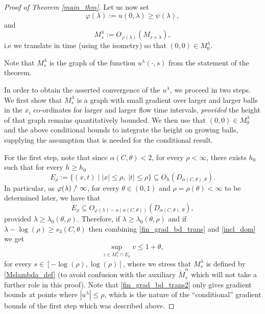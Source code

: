 \documentclass[leqno,11pt]{amsart}
\theoremstyle{definition}
\begin{document}
\begin{proof}[Proof of Theorem \ref{main_thm}]
\bigskip

Let us now set
\begin{equation}
\varphi(\lambda):=u(0,\lambda) \geq \psi(\lambda),
\end{equation}
and 
\begin{equation}\label{Mslambda_def}
M_s^{\lambda}:=O_{\varphi(\lambda)}(M_{s+\lambda}),
\end{equation}
i.e we translate in time (using the isometry) so that $(0,0)\in M_0^{\lambda}$. {Note that $M_s^{\lambda}$ is the graph of the function $u^{\lambda}(\cdot,s)$  from the statement of the theorem.

In order to obtain the asserted convergence of the $u^{\lambda}$, we proceed in two steps. We first show that $M^{\lambda}_s$ is a graph with small gradient over larger and larger balls in the $x_i$ co-ordinates for larger and larger flow time intervals, \textit{provided} the height of that graph remains quantitatively  bounded. We then use that $(0,0)\in M_{0}^{\lambda}$ and the above conditional bounds to integrate the height on growing balls, supplying the assumption that is needed for the conditional result.}

For the first step, note that since $\alpha(C,\theta)<2$, for every $\rho<\infty$, there exists $h_0$ such that for every $h\geq h_0$
\begin{equation}\label{incl_dom_first}
E_{\rho}:=\{(x,t)\;|\; |x|\leq \rho,\; |t| \leq \rho \} \subseteq O_{h}\left(D_{\alpha(C,\theta),\theta}\right).
\end{equation}
In particular, as  $\varphi(\lambda)\nnearrow \infty$, for every $\theta\in (0,1)$ and $\rho=\rho(\theta)<\infty$ to be determined later, we have that
\begin{equation}\label{incl_dom}
E_{\rho} \subseteq O_{ \varphi(\lambda)-a(\alpha(C,\theta))}\left(D_{\alpha(C,\theta),\theta}\right), 
\end{equation}
provided $\lambda\geq \lambda_0(\theta,\rho)$.  Therefore, if $\lambda\geq \lambda_0(\theta,\rho)$ and if $\lambda-\log(\rho)\geq s_3({C},\theta)$ {then combining \eqref{fin_grad_bd_trans} and \eqref{incl_dom}} we get
\begin{equation}\label{fin_grad_bd_trans2}
\sup_{z\in M^{\lambda}_s \cap E_{\rho}} v \leq 1+\theta,
\end{equation}
for every $s\in [-\log(\rho),\log(\rho)]$, where we stress that $M_s^{\lambda}$ is defined by \eqref{Mslambda_def} (to avoid confusion with the auxiliary $\tilde{M}_s^{\alpha}$ which will not take a further role in this proof).  {Note that \eqref{fin_grad_bd_trans2} only gives gradient bounds at points where  $|u^{\lambda}| \leq \rho$, which is the  nature of the ``conditional'' gradient bounds of the first step which was described above.}


\end{proof}
\end{document}
